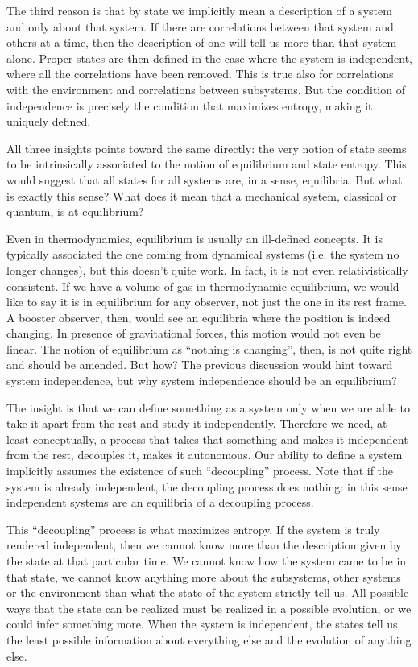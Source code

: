 \documentclass[letterpaper,twocolumn]{article}
\begin{document}
The third reason is that by state we implicitly mean a description of a system and only about that system. If there are correlations between that system and others at a time, then the description of one will tell us more than that system alone. Proper states are then defined in the case where the system is independent, where all the correlations have been removed. This is true also for correlations with the environment and correlations between subsystems. But the condition of independence is precisely the condition that maximizes entropy, making it uniquely defined. 

All three insights points toward the same directly: the very notion of state seems to be intrinsically associated to the notion of equilibrium and state entropy. This would suggest that all states for all systems are, in a sense, equilibria. But what is exactly this sense?  What does it mean that a mechanical system, classical or quantum, is at equilibrium?

Even in thermodynamics, equilibrium is usually an ill-defined concepts. It is typically associated the one coming from dynamical systems (i.e. the system no longer changes), but this doesn't quite work. In fact, it is not even relativistically consistent. If we have a volume of gas in thermodynamic equilibrium, we would like to say it is in equilibrium for any observer, not just the one in its rest frame. A booster observer, then, would see an equilibria where the position is indeed changing. In presence of gravitational forces, this motion would not even be linear. The notion of equilibrium as ``nothing is changing'', then, is not quite right and should be amended. But how? The previous discussion would hint toward system independence, but why system independence should be an equilibrium?

The insight is that we can define something as a system only when we are able to take it apart from the rest and study it independently. Therefore we need, at least conceptually, a process that takes that something and makes it independent from the rest, decouples it, makes it autonomous. Our ability to define a system implicitly assumes the existence of such ``decoupling'' process. Note that if the system is already independent, the decoupling process does nothing: in this sense independent systems are an equilibria of a decoupling process.

This ``decoupling'' process is what maximizes entropy. If the system is truly rendered independent, then we cannot know more than the description given by the state at that particular time. We cannot know how the system came to be in that state, we cannot know anything more about the subsystems, other systems or the environment than what the state of the system strictly tell us. All possible ways that the state can be realized must be realized in a possible evolution, or we could infer something more.  When the system is independent, the states tell us the least possible information about everything else and the evolution of anything else.
\end{document}
